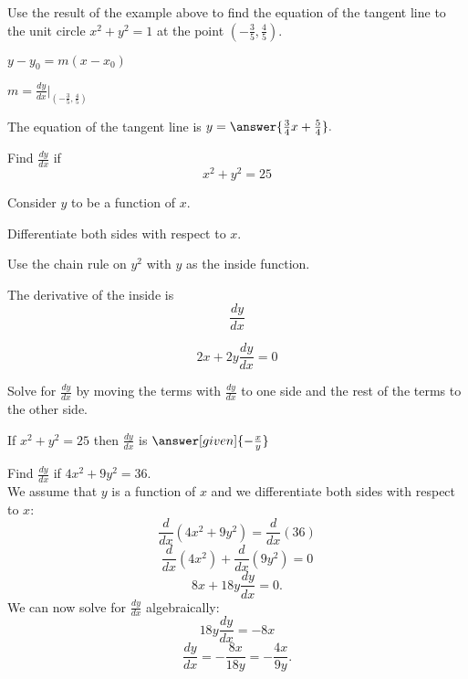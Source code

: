 \documentclass{ximera}
\begin{document}
\begin{problem}
Use the result of the example above to find the equation of the tangent line to the unit circle $x^2 + y^2 = 1$ at the point $(-\tfrac35,\tfrac45).$

\begin{hint}
$y-y_0 = m(x-x_0)$
\end{hint}
\begin{hint}
$m = \frac{dy}{dx}\bigg|_{(-\frac35, \frac45)}$
\end{hint}
The equation of the tangent line is $y = \answer{\frac34 x+\frac54}.$
\end{problem}


\begin{problem} %
  Find $\frac{dy}{dx}$ if
  \[
  x^2 + y^2 = 25
  \]
  
	  
    \begin{hint}
      Consider $y$ to be a function of $x$.
    \end{hint}
		\begin{hint}
		  Differentiate both sides with respect to $x$.
		\end{hint}
    \begin{hint}
      Use the chain rule on $y^2$ with $y$ as the inside function.
    \end{hint}
    \begin{hint}
      The derivative of the inside is 
      \[
      \frac{dy}{dx}
      \]
    \end{hint}
		\begin{hint}
		  \[
			2x + 2y\frac{dy}{dx} = 0
			\]
		\end{hint}
		\begin{hint}
		  Solve for $\frac{dy}{dx}$ by moving the terms with $\frac{dy}{dx}$
			to one side and the 
			rest of the terms to the other side.
		\end{hint}
    
		If $x^2 + y^2 = 25$ then $\frac{dy}{dx}$ is
		 $\answer[given]{-\frac{x}{y}}$
		
\end{problem}




\begin{example} %
Find  $\frac{dy}{dx}$ if $4x^2 + 9y^2 = 36$.\\
We assume that $y$ is a function of $x$ and we differentiate both 
sides with respect to $x$:
\[\frac{d}{dx}(4x^2 + 9y^2)  = \frac{d}{dx} (36)\]
\[\frac{d}{dx}(4x^2) + \frac{d}{dx} (9y^2) = 0\]
\[8x + 18y\frac{dy}{dx} = 0.\]
We can now solve for $\displaystyle{\frac{dy}{dx}}$ algebraically:
\[18y\frac{dy}{dx} = -8x\]
\[\frac{dy}{dx} = -\frac{8x}{18y}= -\frac{4x}{9y}.\]
\end{example}
\end{document}

